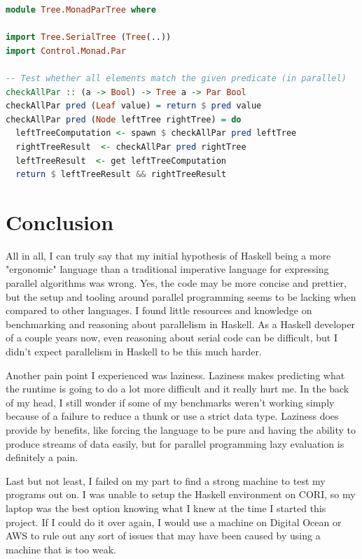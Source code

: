\documentclass[a4paper, 10pt]{article}
\begin{document}
\begin{lstlisting}[language=Haskell, caption=Tree check using monad-par]
module Tree.MonadParTree where

import Tree.SerialTree (Tree(..))
import Control.Monad.Par

-- Test whether all elements match the given predicate (in parallel)
checkAllPar :: (a -> Bool) -> Tree a -> Par Bool
checkAllPar pred (Leaf value) = return $ pred value
checkAllPar pred (Node leftTree rightTree) = do
  leftTreeComputation <- spawn $ checkAllPar pred leftTree
  rightTreeResult  <- checkAllPar pred rightTree
  leftTreeResult  <- get leftTreeComputation
  return $ leftTreeResult && rightTreeResult
\end{lstlisting}

\section{Conclusion}

All in all, I can truly say that my initial hypothesis of Haskell being a more "ergonomic" language than a traditional imperative language for expressing parallel algorithms was wrong. Yes, the code may be more concise and prettier, but the setup and tooling around parallel programming seems to be lacking when compared to other languages. I found little resources and knowledge on benchmarking and reasoning about parallelism in Haskell. As a Haskell developer of a couple years now, even reasoning about serial code can be difficult, but I didn't expect parallelism in Haskell to be this much harder. 

Another pain point I experienced was laziness. Laziness makes predicting what the runtime is going to do a lot more difficult and it really hurt me. In the back of my head, I still wonder if some of my benchmarks weren't working simply because of a failure to reduce a thunk or use a strict data type. Laziness does provide by benefits, like forcing the language to be pure and having the ability to produce streams of data easily, but for parallel programming lazy evaluation is definitely a pain.

Last but not least, I failed on my part to find a strong machine to test my programs out on. I was unable to setup the Haskell environment on CORI, so my laptop was the best option knowing what I knew at the time I started this project. If I could do it over again, I would use a machine on Digital Ocean or AWS to rule out any sort of issues that may have been caused by using a machine that is too weak.
\end{document}
